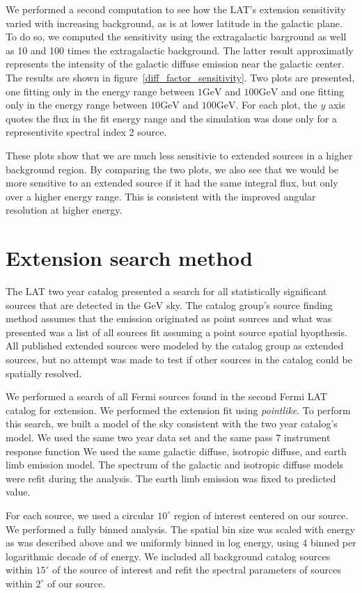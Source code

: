 \documentclass[preprint]{aastex}
\newcommand{\gev}{\text{GeV}\xspace}
\newcommand{\pointlike}{{\em pointlike}\xspace}
\begin{document}
We performed a second computation to see how the LAT's extension
sensitivity varied with increasing background, as is at lower latitude
in the galactic plane. To do so, we computed the sensitivity using the
extragalactic barground as well as 10 and 100 times the extragalactic
background. The latter result approximatly represents the intensity of
the galactic diffuse emission near the galactic center. The results are
shown in figure~\ref{diff_factor_sensitivity}. Two plots are presented,
one fitting only in the energy range between $1\gev$ and $100\gev$ and
one fitting only in the energy range between $10\gev$ and $100\gev$. For
each plot, the $y$ axis quotes the flux in the fit energy range and the
simulation was done only for a representivite spectral index 2 source.

These plots show that we are much less sensitivie to extended sources in
a higher background region. By comparing the two plots, we also see that
we would be more sensitive to an extended source if it had the same
integral flux, but only over a higher energy range. This is 
consistent with the improved angular resolution at higher energy.

\section{Extension search method}

The LAT two year catalog presented a search for all
statistically significant sources that are detected in the $\gev$
sky\cite{2FGL_catalog}.  The catalog group's source finding method assumes
that the emission originated as point sources and what was presented was
a list of all sources fit assuming a point source spatial hyopthesis. All
published extended sources were modeled by the catalog group as extended
sources, but no attempt was made to test if other sources in the catalog
could be spatially resolved.

We performed a search of all Fermi sources found in the second Fermi LAT
catalog for extension.  We performed the extension fit using \pointlike.
To perform this search, we built a model of the sky consistent with
the two year catalog's model.   We used the same two year data set and
the same pass 7 instrument response function We used the same galactic
diffuse, isotropic diffuse, and earth limb emission model. The spectrum
of the galactic and isotropic diffuse models were refit during the
analysis. The earth limb emission was fixed to predicted value.

For each source, we used a circular $10^\circ$ region of interest centered
on our source. We performed a fully binned analysis.  The spatial bin
size was scaled with energy as was described above and we uniformly
binned in log energy, using 4 binned per logarithmic decade of of energy.
We included all background catalog sources within $15^\circ$ of the source
of interest and refit the spectral parameters of sources within $2^\circ$
of our source.
\end{document}
